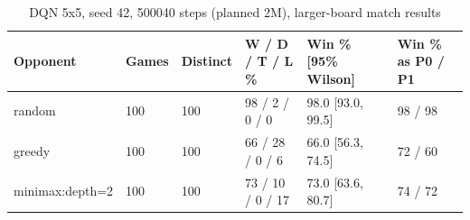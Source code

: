 \begin{table}[htbp]
\centering
\caption{DQN 5x5, seed 42, 500040 steps (planned 2M), larger-board match results}
\label{tab:dqn_5x5}
\begin{tabular}{llllll}
\toprule
Opponent & Games & Distinct & W / D / T / L \% & Win \% [95\% Wilson] & Win \% as P0 / P1 \\
\midrule
random & 100 & 100 & 98 / 2 / 0 / 0 & 98.0 [93.0, 99.5] & 98 / 98 \\
greedy & 100 & 100 & 66 / 28 / 0 / 6 & 66.0 [56.3, 74.5] & 72 / 60 \\
minimax:depth=2 & 100 & 100 & 73 / 10 / 0 / 17 & 73.0 [63.6, 80.7] & 74 / 72 \\
\bottomrule
\end{tabular}
\end{table}
